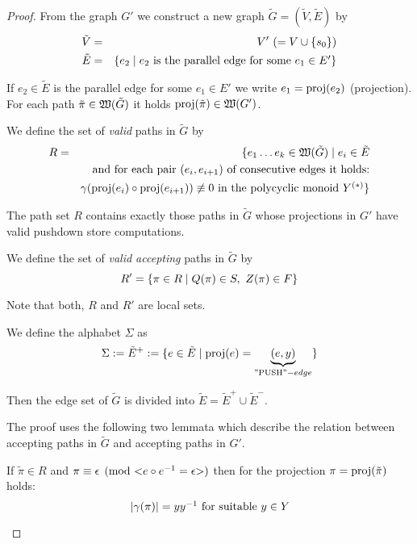 \begin{proof}
From the graph $G'$ we construct a new graph $\tilde{G} = (\tilde{V},
\tilde{E})$ by
\begin{eqnarray*}
\tilde{V} &=& V' \ (=V \cup \mbox{$\{s_0\}$}) \\
\tilde{E} &=& \mbox{$\{e_2 \mid e_2\text{ is the parallel edge for some $e_1 \in
E'$}\}$}
\end{eqnarray*}

If $e_2 \in \tilde{E}$ is the parallel edge for some $e_1 \in E'$ we write $e_1
= \mathrm{proj}({e_2})$ (projection). For each path $\tilde{\pi} \in \mbox{$\mathfrak{W}({\tilde{G}})$}$ it
holds $\mathrm{proj}({\tilde{\pi}}) \in \mbox{$\mathfrak{W}({G'})$}$.

We define the set of {\em valid} paths in $\tilde{G}$ by
\begin{eqnarray*}
R &=& \{ e_1 \ldots e_k \in \mbox{$\mathfrak{W}({\tilde{G}})$} \mid e_i \in \tilde{E} \\
& & \text{and for each pair }(e_i, e_{i+1})\text{ of consecutive edges it
holds:}\\
& & \gamma(\mathrm{proj}({e_i}) \circ \mathrm{proj}({e_{i+1}})) \not\equiv 0\text{ in the
polycyclic monoid }\mbox{${Y}^{(*)}$} \}
\end{eqnarray*} 

The path set $R$ contains exactly those paths in $\tilde{G}$ whose projections
in $G'$ have valid pushdown store computations.

We define the set of {\em valid accepting} paths in $\tilde{G}$ by
\begin{equation*}
R' = \mbox{$\{\pi \in R \mid Q(\pi) \in S,\ Z(\pi) \in F\}$}
\end{equation*}

Note that both, $R$ and $R'$ are local sets.

We define the alphabet $\Sigma$ as 
\begin{equation*}
\Sigma := \tilde{E}^+ := \mbox{$\{e \in \tilde{E} \mid \mathrm{proj}({e}) =
\underbrace{(e,y)}_{\text{''PUSH''}-edge}\}$}
\end{equation*}

Then the edge set of $\tilde{G}$ is divided into $\tilde{E} = \tilde{E}^+ \cup
\tilde{E}^-$.

The proof uses the following two lemmata which describe the relation between
accepting paths in $\tilde{G}$ and accepting paths in $G'$.

\begin{lemma}
If $\tilde{\pi} \in R$ and $\pi \equiv \epsilon \pmod{{<}e\circ \mbox{${e}^{-1}$} =
\epsilon{>}}$ then for the projection $\pi = \mathrm{proj}({\tilde{\pi}})$ holds:
\[ |\gamma(\pi)| = y \mbox{${y}^{-1}$}\text{ for suitable }y \in Y \]
\end{lemma}


\end{proof}
